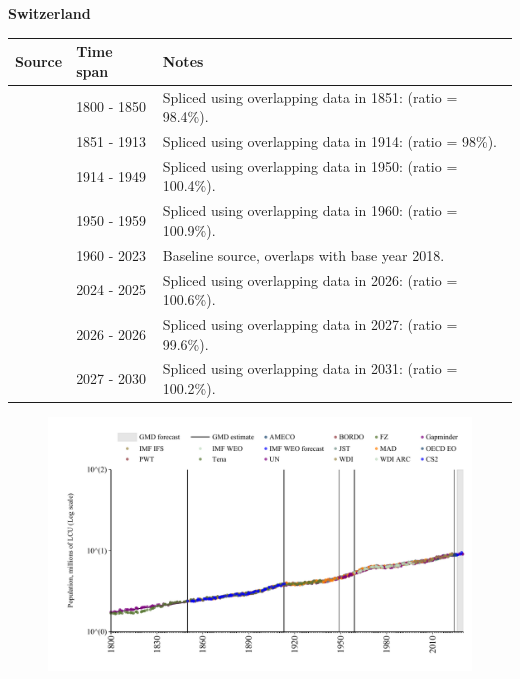 \documentclass[12pt,a4paper,landscape]{article}
\begin{document}
\begin{adjustbox}{max totalsize={\paperwidth}{\paperheight},center}
\begin{minipage}[t][\textheight][t]{\textwidth}
\vspace*{0.5cm}
{}
\begin{center}
{\Large\bfseries Switzerland}
\end{center}
\vspace{0.5cm}
\begin{table}[H]
\centering
\small
\begin{tabular}{|l|l|l|}
\hline
\textbf{Source} & \textbf{Time span} & \textbf{Notes} \\
\hline
\rowcolor{white}\cite{Gapminder}& 1800 - 1850 &Spliced using overlapping data in 1851: (ratio = 98.4\%).\\
\rowcolor{lightgray}\cite{CS2_CHE}& 1851 - 1913 &Spliced using overlapping data in 1914: (ratio = 98\%).\\
\rowcolor{white}\cite{Gapminder}& 1914 - 1949 &Spliced using overlapping data in 1950: (ratio = 100.4\%).\\
\rowcolor{lightgray}\cite{IMF_IFS}& 1950 - 1959 &Spliced using overlapping data in 1960: (ratio = 100.9\%).\\
\rowcolor{white}\cite{WDI}& 1960 - 2023 &Baseline source, overlaps with base year 2018.\\
\rowcolor{lightgray}\cite{OECD_EO}& 2024 - 2025 &Spliced using overlapping data in 2026: (ratio = 100.6\%).\\
\rowcolor{white}\cite{AMECO}& 2026 - 2026 &Spliced using overlapping data in 2027: (ratio = 99.6\%).\\
\rowcolor{lightgray}\cite{Gapminder}& 2027 - 2030 &Spliced using overlapping data in 2031: (ratio = 100.2\%).\\
\hline
\end{tabular}
\end{table}
\begin{figure}[H]
\centering
\includegraphics[width=\textwidth,height=0.6\textheight,keepaspectratio]{graphs/CHE_pop.pdf}
\end{figure}
\end{minipage}
\end{adjustbox}
\end{document}
